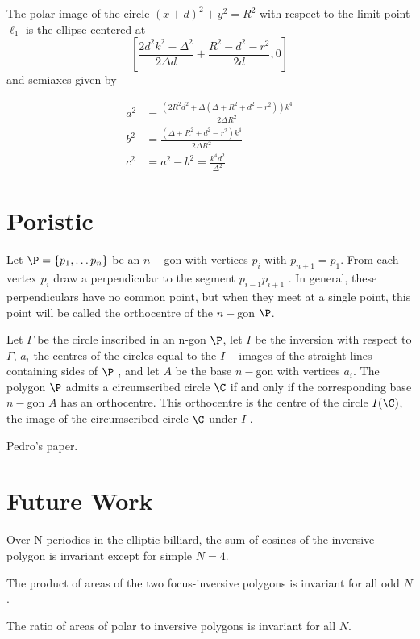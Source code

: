  
 \begin{lemma} The polar image of the circle $(x+d)^2+y^2=R^2$ with respect to the limit point $  \ell_1 $ is the ellipse centered at
 \[ \left[ \frac{ 2 d^2 k^2 - \Delta^2}{ 2 \Delta d} + \frac{R^2 - d^2 - r^2}{ 2 d},0\right] \]
 and semiaxes given by
 
 \begin{align*}
     a^2&= \frac{(2R^2d^2 + \Delta (  \Delta+R^2 + d^2 - r^2 ))k^4}{ 2 \Delta R^2}  \\
     b^2&=  \frac{(\Delta+R^2 + d^2 - r^2   )k^4}{ 2 \Delta R^2} \\
     c^2&=a^2-b^2=\frac{k^4d^2}{\Delta^2}
 \end{align*}
 \end{lemma}

 
\section{Poristic}

\begin{definition}
Let $\P=\{p_1,\ldots p_n\}$ be an $n-$gon with vertices  $p_i$ with $p_{n+1}=p_1$. From each vertex $p_i$ draw a perpendicular to the segment $p_{i-1}p_{i+1}$ .
In general, these perpendiculars have no
common point, but when  they meet at a single point,   this point will be   called
the orthocentre of the $n-$gon  $\P$.
\end{definition}
\begin{theorem}
Let $\Gamma$   be the circle inscribed in an n-gon $\P$, let $I$ be the inversion with
respect to $\Gamma$, $a_i$ the centres of the circles equal to the $I-$images of the straight lines
containing sides of $\P$ , and let $A$ be the base $n-$gon with vertices $a_i$. The polygon $\P$
admits a circumscribed circle $\C$ if and only if the corresponding base $n-$gon $A$ has
an orthocentre. This orthocentre is the centre of the circle
$I(\C)$, the image of the
circumscribed circle $\C$ under $I$ .
\end{theorem}

Pedro's paper.

\section{Future Work}

\begin{conjecture}
Over N-periodics in the elliptic billiard, the sum of cosines of the inversive polygon is invariant except for simple $N=4$.
\end{conjecture}

\begin{conjecture}
The product of areas of the two focus-inversive polygons is invariant for all odd $N$. 
\end{conjecture}

\begin{conjecture}
The ratio of areas of polar to inversive polygons is invariant for all $N$. 
\end{conjecture}
